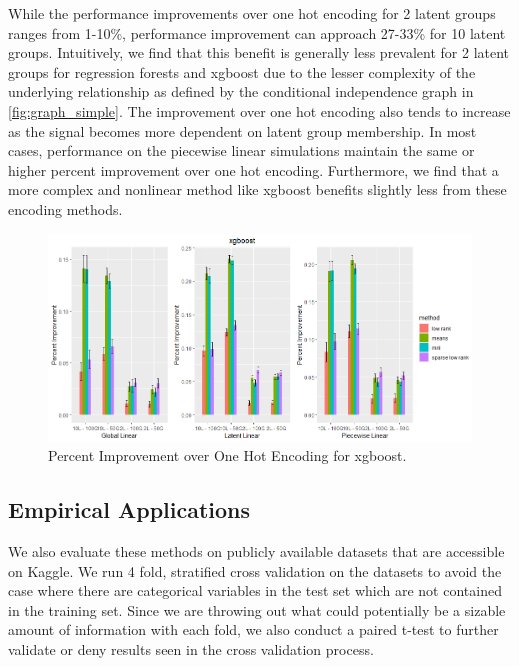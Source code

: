 \documentclass{article}
\theoremstyle{plain}
\theoremstyle{definition}
\theoremstyle{remark}
\begin{document}
While the performance improvements over one hot encoding for 2 latent groups ranges from 1-10\%, performance improvement can approach 27-33\% for 10 latent groups. Intuitively, we find that this benefit is generally less prevalent for 2 latent groups for regression forests and xgboost due to the lesser complexity of the underlying relationship as defined by the conditional independence graph in \ref{fig:graph_simple}. The improvement over one hot encoding also tends to increase as the signal becomes more dependent on latent group membership. In most cases, performance on the piecewise linear simulations maintain the same or higher percent improvement over one hot encoding. Furthermore, we find that a more complex and nonlinear method like xgboost benefits slightly less from these encoding methods.

\begin{figure}[htbp]
	\centering
	\includegraphics[width=\linewidth]{figures/xgb_final.png}
	\caption {Percent Improvement over One Hot Encoding for xgboost.}
	\label{tab:xgb_sim_setups}
\end{figure}



\subsection{Empirical Applications}
\label{sec:empirical_applications}

We also evaluate these methods on publicly available datasets that are accessible on Kaggle. We run 4 fold, stratified cross validation on the datasets to avoid the case where there are categorical variables in the test set which are not contained in the training set. Since we are throwing out what could potentially be a sizable amount of information with each fold, we also conduct a paired t-test to further validate or deny results seen in the cross validation process.
\end{document}
